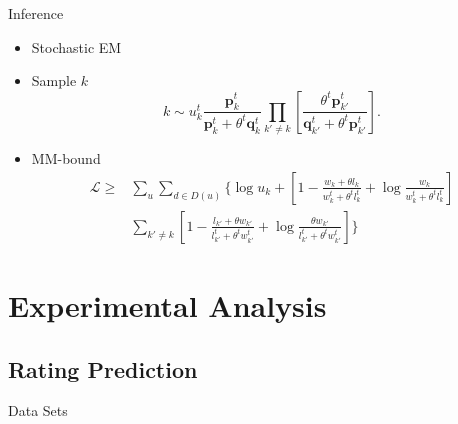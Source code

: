 \documentclass[xcolor=dvipsnames]{beamer}
\newcommand{\Loss}{\mathcal{L}}
\begin{document}
\begin{frame}{Inference}
\begin{itemize}
    \item Stochastic EM
    \item Sample $k$
    \begin{equation}
 k \sim u_k^{t} \frac{\mathbf{p}_{k}^t} {\mathbf{p}_{k}^t+\theta^t \mathbf{q}_{k}^t} \prod_{k'\neq k}  [\frac{\theta^t \mathbf{p}_{k'}^t} {\mathbf{q}_{k'}^t + \theta^t \mathbf{p}_{k'}^t}].
 \end{equation}
 \item MM-bound
 \begin{eqnarray}
     \Loss \geq & \sum_u \sum_{d\in D(u)} \{\log  u_k  + [ 1- \frac{w_k+\theta l_k}{ w_k^t + \theta^t l_k^t}  + \log \frac{w_{k}} {w_{k}^t+\theta ^t l_{k}^t} ] \\\nonumber 
     & \sum_{k'\neq k}  [ 1- \frac{ l_{k'}+\theta w_{k'}}{ l_{k'}^t+\theta^t w_{k'}^t}  + \log \frac{\theta w_{k'}} {l_{k'}^t+\theta ^t w_{k'}^t} ] \}
 \end{eqnarray}
\end{itemize}
    
\end{frame}
\section{Experimental Analysis}
\subsection{Rating Prediction}

\begin{frame}{Data Sets}
    \begin{table}[htp]
\caption{Statistics of Datasets with ratings}
\small
\centering
{}
\label{tab:datasets}
\end{table}
\end{frame}
\end{document}
